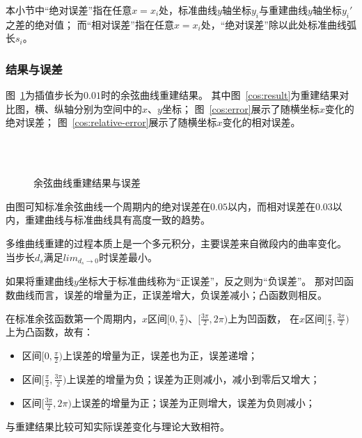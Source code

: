 本小节中“绝对误差”指在任意$x=x_i$处，标准曲线$y$轴坐标$y_i$与重建曲线$y$轴坐标$y_i'$之差的绝对值；
而“相对误差”指在任意$x=x_i$处，“绝对误差”除以此处标准曲线弧长$s_i$。

\subsubsection{结果与误差}
\FloatBarrier
图~\ref{fig:cos}为插值步长为$0.01$时的余弦曲线重建结果。
其中图~\ref{cos:result}为重建结果对比图，横、纵轴分别为空间中的$x$、$y$坐标；
图~\ref{cos:error}展示了随横坐标$x$变化的绝对误差；
图~\ref{cos:relative-error}展示了随横坐标$x$变化的相对误差。

\begin{figure}
\centering
{}\\
\\
\caption{余弦曲线重建结果与误差}
\label{fig:cos}
\end{figure}

由图可知标准余弦曲线一个周期内的绝对误差在$0.05$以内，而相对误差在$0.03$以内，重建曲线与标准曲线具有高度一致的趋势。

多维曲线重建的过程本质上是一个多元积分，主要误差来自微段内的曲率变化。
当步长$d_s$满足$lim_{d_s\rightarrow 0}$时误差最小。

如果将重建曲线$y$坐标大于标准曲线称为“正误差”，反之则为“负误差”。
那对凹函数曲线而言，误差的增量为正，正误差增大，负误差减小；凸函数则相反。

在标准余弦函数第一个周期内，$x$区间$[0, \frac{\pi}{2})$、$[\frac{3\pi}{2}, 2\pi)$上为凹函数，
在$x$区间$[\frac{\pi}{2}, \frac{3\pi}{2})$上为凸函数，故有：

\begin{itemize}
\item 区间$[0, \frac{\pi}{2})$上误差的增量为正，误差也为正，误差递增；
\item 区间$[\frac{\pi}{2}, \frac{3\pi}{2})$上误差的增量为负；误差为正则减小，减小到零后又增大；
\item 区间$[\frac{3\pi}{2}, 2\pi)$上误差的增量为正；误差为正则增大，误差为负则减小；
\end{itemize}

与重建结果比较可知实际误差变化与理论大致相符。

\FloatBarrier

